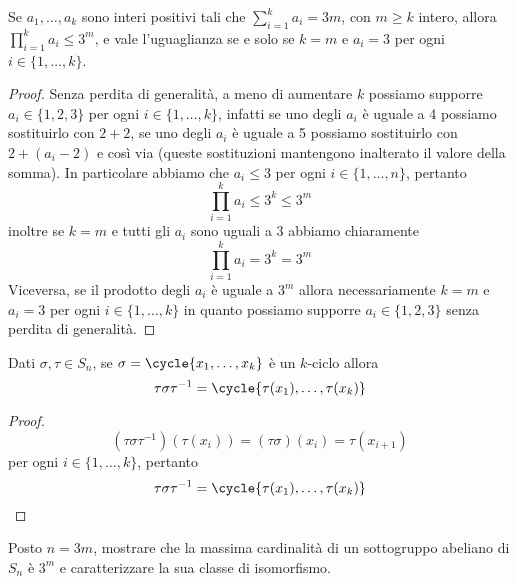 \documentclass[11pt]{scrartcl}
\begin{document}
\begin{lemma}
    \label{lemma4.0}
    Se $a_1, \ldots, a_k$ sono interi positivi tali che $\displaystyle
    \sum_{i = 1}^k a_i = 3m$,
    con $m \geqslant k$ intero, allora $\displaystyle
        \prod_{i = 1}^k a_i \leq 3^m$, 
        e vale l'uguaglianza se e solo se $k = m$ e $a_i = 3$ per ogni $i \in \{1, \ldots, k\}$.
\end{lemma}

\begin{proof}
    Senza perdita di generalità, a meno di aumentare $k$ possiamo supporre
    $a_i \in \{1, 2, 3\}$ per ogni $i \in \{1, \ldots, k\}$, infatti se 
    uno degli $a_i$ è uguale a 4 possiamo sostituirlo con $2 + 2$, se uno degli
    $a_i$ è uguale a 5 possiamo sostituirlo con $2 + (a_i - 2)$ e così via
    (queste sostituzioni mantengono inalterato il valore della somma).
    In particolare abbiamo che $a_i \leqslant 3$ per ogni $i \in \{1, \ldots, n\}$,
    pertanto 
    \[
        \prod_{i = 1}^k a_i \leq 3^k \leq 3^m
    \]
    inoltre se $k = m$ e tutti gli $a_i$ sono uguali a 3 abbiamo chiaramente
    \[
        \prod_{i = 1}^k a_i = 3^k = 3^m
    \]
    Viceversa, se il prodotto degli $a_i$ è uguale a $3^m$ allora necessariamente
    $k = m$ e $a_i = 3$ per ogni $i \in \{1, \ldots, k\}$ in quanto possiamo
    supporre $a_i \in \{1, 2, 3\}$ senza perdita di generalità.
\end{proof}

\begin{lemma}
    \label{lemma5.0}
    Dati $\sigma, \tau \in S_n$, se $\sigma = \cycle{x_1, \ldots, x_k}$ è un 
    $k$-ciclo allora 
    \[
        \tau\sigma\tau^{-1} = \cycle{\tau(x_1),\ldots, \tau(x_k)}
    \]
\end{lemma}

\begin{proof}
    \[
        (\tau\sigma\tau^{-1})(\tau(x_i)) = (\tau\sigma)(x_i) = \tau(x_{i + 1})
    \]per ogni $i \in \{1, \ldots, k\}$, pertanto
    \[
        \tau\sigma\tau^{-1} = \cycle{\tau(x_1), \ldots, \tau(x_k)}
    \]
\end{proof}


\begin{exercise}
    Posto $n = 3m$, mostrare che la massima cardinalità di un sottogruppo
    abeliano di $S_n$ è $3^m$ e caratterizzare la sua classe di isomorfismo.
\end{exercise}
\end{document}
